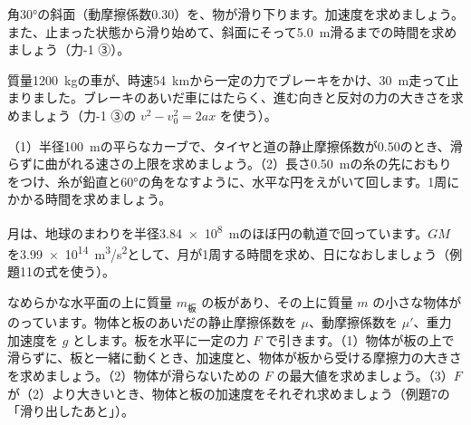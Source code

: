 \bkproblem 角30°の斜面（動摩擦係数0.30）を、物が滑り下ります。加速度を求めましょう。また、止まった状態から滑り始めて、斜面にそって\qty{5.0}{m}滑るまでの時間を求めましょう（力-1 ③）。

\bkproblem 質量\qty{1200}{kg}の車が、時速\qty{54}{km}から一定の力でブレーキをかけ、\qty{30}{m}走って止まりました。ブレーキのあいだ車にはたらく、進む向きと反対の力の大きさを求めましょう（力-1 ③の $v^2-v_0^2=2ax$ を使う）。

\bkproblem （1）半径\qty{100}{m}の平らなカーブで、タイヤと道の静止摩擦係数が0.50のとき、滑らずに曲がれる速さの上限を求めましょう。（2）長さ\qty{0.50}{m}の糸の先におもりをつけ、糸が鉛直と60°の角をなすように、水平な円をえがいて回します。1周にかかる時間を求めましょう。

\bkproblem 月は、地球のまわりを半径\qty{3.84e8}{m}のほぼ円の軌道で回っています。$GM$ を\qty{3.99e14}{m^3/s^2}として、月が1周する時間を求め、日になおしましょう（例題11の式を使う）。

\bkproblem なめらかな水平面の上に質量 $m_{\text{板}}$ の板があり、その上に質量 $m$ の小さな物体がのっています。物体と板のあいだの静止摩擦係数を $\mu$、動摩擦係数を $\mu'$、重力加速度を $g$ とします。板を水平に一定の力 $F$ で引きます。（1）物体が板の上で滑らずに、板と一緒に動くとき、加速度と、物体が板から受ける摩擦力の大きさを求めましょう。（2）物体が滑らないための $F$ の最大値を求めましょう。（3）$F$ が（2）より大きいとき、物体と板の加速度をそれぞれ求めましょう（例題7の「滑り出したあと」）。

